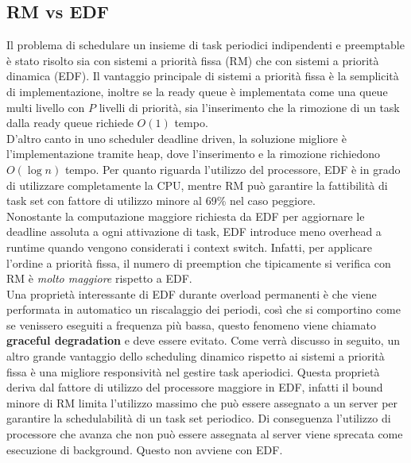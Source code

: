 \documentclass[12pt]{article}
\begin{document}
\subsection{RM vs EDF}
Il problema di schedulare un insieme di task periodici indipendenti e preemptable è stato risolto sia con sistemi a priorità fissa (RM) che con sistemi a priorità dinamica (EDF).
Il vantaggio principale di sistemi a priorità fissa è la semplicità di implementazione, inoltre se la ready queue è implementata come una queue multi livello con $P$ livelli di priorità,
sia l'inserimento che la rimozione di un task dalla ready queue richiede $O(1)$ tempo.
\\
D'altro canto in uno scheduler deadline driven, la soluzione migliore è l'implementazione tramite heap, dove l'inserimento e la rimozione richiedono $O(\log n)$ tempo.
Per quanto riguarda l'utilizzo del processore, EDF è in grado di utilizzare completamente la CPU, mentre RM può garantire la fattibilità di task set con fattore di utilizzo minore al 69\% nel caso peggiore.
\\
Nonostante la computazione maggiore richiesta da EDF per aggiornare le deadline assoluta a ogni attivazione di task, EDF introduce meno overhead a runtime quando vengono considerati i context switch.
Infatti, per applicare l'ordine a priorità fissa, il numero di preemption che tipicamente si verifica con RM è \textit{molto maggiore} rispetto a EDF.
\\
Una proprietà interessante di EDF durante overload permanenti è che viene performata in automatico un riscalaggio dei periodi, così che si comportino come se venissero eseguiti a frequenza più bassa, questo fenomeno viene chiamato \textbf{graceful degradation} e deve essere evitato.
Come verrà discusso in seguito, un altro grande vantaggio dello scheduling dinamico rispetto ai sistemi a priorità fissa è una migliore responsività nel gestire task aperiodici.
Questa proprietà deriva dal fattore di utilizzo del processore maggiore in EDF, infatti il bound minore di RM limita l'utilizzo massimo che può essere assegnato a un server per garantire la schedulabilità di un task set periodico.
Di conseguenza l'utilizzo di processore che avanza che non può essere assegnata al server viene sprecata come esecuzione di background.
Questo non avviene con EDF.
\end{document}
